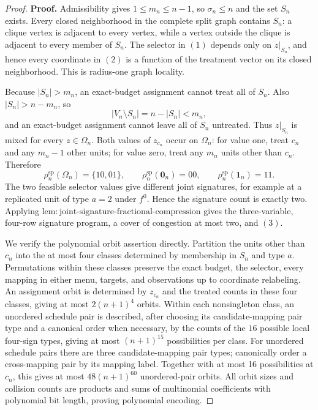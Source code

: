 \documentclass{article}
\begin{document}
\begin{proof}
\textbf{Proof.}
Admissibility gives \(1\le m_n\le n-1\), so \(\sigma_n\le n\) and the set \(S_n\) exists. Every closed neighborhood in the complete split graph contains \(S_n\): a clique vertex is adjacent to every vertex, while a vertex outside the clique is adjacent to every member of \(S_n\). The selector in \((1)\) depends only on \(z|_{S_n}\), and hence every coordinate in \((2)\) is a function of the treatment vector on its closed neighborhood. This is radius-one graph locality.

Because \(|S_n|>m_n\), an exact-budget assignment cannot treat all of \(S_n\). Also \(|S_n|>n-m_n\), so
\[
 |V_n\setminus S_n|=n-|S_n|<m_n,
\]
and an exact-budget assignment cannot leave all of \(S_n\) untreated. Thus \(z|_{S_n}\) is mixed for every \(z\in\Omega_n\). Both values of \(z_{c_n}\) occur on \(\Omega_n\): for value one, treat \(c_n\) and any \(m_n-1\) other units; for value zero, treat any \(m_n\) units other than \(c_n\). Therefore
\[
 \rho_n^{\mathrm{sp}}(\Omega_n)=\{10,01\},
 \qquad
 \rho_n^{\mathrm{sp}}(\mathbf 0_n)=00,
 \qquad
 \rho_n^{\mathrm{sp}}(\mathbf 1_n)=11. \tag{5}
\]
The two feasible selector values give different joint signatures, for example at a replicated unit of type \(a=2\) under \(f^0\). Hence the signature count is exactly two. Applying \(\mathrm{lem{:}joint\text{-}signature\text{-}fractional\text{-}compression}\) gives the three-variable, four-row signature program, a cover of congestion at most two, and \((3)\).

We verify the polynomial orbit assertion directly. Partition the units other than \(c_n\) into the at most four classes determined by membership in \(S_n\) and type \(a\). Permutations within these classes preserve the exact budget, the selector, every mapping in either menu, targets, and observations up to coordinate relabeling. An assignment orbit is determined by \(z_{c_n}\) and the treated counts in these four classes, giving at most \(2(n+1)^4\) orbits. Within each nonsingleton class, an unordered schedule pair is described, after choosing its candidate-mapping pair type and a canonical order when necessary, by the counts of the \(16\) possible local four-sign types, giving at most \((n+1)^{15}\) possibilities per class. For unordered schedule pairs there are three candidate-mapping pair types; canonically order a cross-mapping pair by its mapping label. Together with at most 16 possibilities at \(c_n\), this gives at most \(48(n+1)^{60}\) unordered-pair orbits. All orbit sizes and collision counts are products and sums of multinomial coefficients with polynomial bit length, proving polynomial encoding.


\end{proof}
\end{document}
